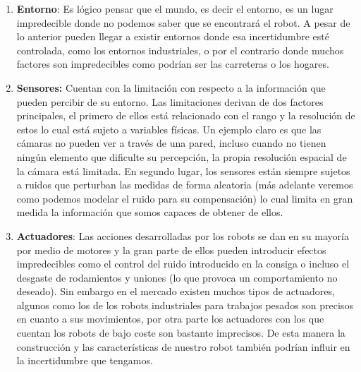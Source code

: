 \begin{enumerate}
 \item \textbf{Entorno}: Es lógico pensar que el mundo, es decir el entorno, es un lugar impredecible donde no podemos saber que se encontrará el robot. A pesar de lo anterior pueden llegar a existir entornos donde esa incertidumbre esté controlada, como los entornos industriales, o por el contrario donde muchos factores son impredecibles como podrían ser las carreteras o los hogares.
 \item \textbf{Sensores:} Cuentan con la limitación con respecto a la información que pueden percibir de su entorno. Las limitaciones derivan de dos factores principales, el primero de ellos está relacionado con el rango y la resolución de estos lo cual está sujeto a variables físicas. Un ejemplo claro es que las cámaras no pueden ver a través de una pared, incluso cuando no tienen ningún elemento que dificulte su percepción, la propia resolución espacial de la cámara está limitada. En segundo lugar, los sensores están siempre sujetos a ruidos que perturban las medidas de forma aleatoria (más adelante veremos como podemos modelar el ruido para su compensación) lo cual limita en gran medida la información que somos capaces de obtener de ellos.
%
%
%
%
%
 \item \textbf{Actuadores}: Las acciones desarrolladas por los robots se dan en su mayoría por medio de motores y la gran parte de ellos pueden introducir efectos impredecibles como el control del ruido introducido en la consiga o incluso el desgaste de rodamientos y uniones (lo que provoca un comportamiento no deseado). Sin embargo en el mercado existen muchos tipos de actuadores, algunos como los de los robots industriales para trabajos pesados son precisos en cuanto a sus movimientos, por otra parte los actuadores con los que cuentan los robots de bajo coste son bastante imprecisos. De esta manera la construcción y las características de nuestro robot también podrían influir en la incertidumbre que tengamos.
%
%
%

\end{enumerate}
